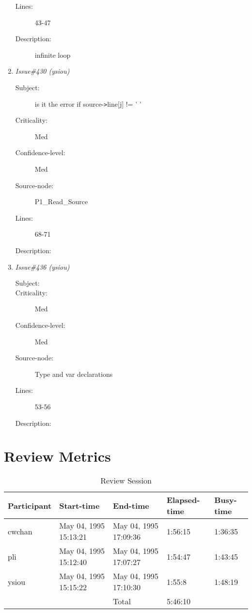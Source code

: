 \begin{enumerate}
\begin{description}
\item [Lines:] 43-47

\item [Description:] infinite loop
\end{description}
\item {\it Issue\#430 (ysiou)}
\begin{description}
\item [Subject:] is it the error if source-{\tt >}line[j] != ' '
\item [Criticality:] Med
\item [Confidence-level:] Med
\item [Source-node:] P1\_Read\_Source

\item [Lines:] 68-71

\item [Description:] 
\end{description}
\item {\it Issue\#436 (ysiou)}
\begin{description}
\item [Subject:] 
\item [Criticality:] Med
\item [Confidence-level:] Med
\item [Source-node:] Type and var declarations

\item [Lines:] 53-56

\item [Description:] 
\end{description}
\end{enumerate}
\section{Review Metrics}
\begin{table}[hb]
\begin{center}
\begin{tabular}{|l|l|l|l|l|}
\hline
Participant & Start-time & End-time & Elapsed-time & Busy-time \\
\hline
cwchan & May 04, 1995 15:13:21 & May 04, 1995 17:09:36 & 1:56:15 & 1:36:35 \\
pli & May 04, 1995 15:12:40 & May 04, 1995 17:07:27 & 1:54:47 & 1:43:45 \\
ysiou & May 04, 1995 15:15:22 & May 04, 1995 17:10:30 & 1:55:8 & 1:48:19 \\
\hline
 & & Total & 5:46:10 & \\
\hline
\end{tabular}
\end{center}
\caption{Review Session}
\end{table}


